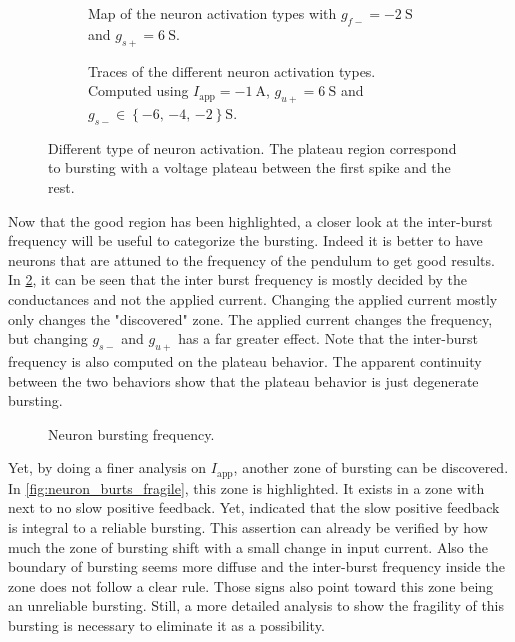 \begin{figure}[!htbp]
    \centering
    \begin{subfigure}[t]{\textwidth}
        \centering
        \caption{Map of the neuron activation types with $g_{f-} =  \qty{-2}{\siemens}$ and $g_{s+} =  \qty{6}{\siemens}$.}
    \end{subfigure}
    
    \begin{subfigure}[b]{\textwidth}
        \centering
        \caption{Traces of the different neuron activation types. Computed using $I_\text{app} = \qty{-1}{\ampere}$, $g_{u+} = \qty{6}{\siemens}$ and $g_{s-}  \in \left\{\num{-6},\,\num{-4},\,\num{-2}\right\}\unit{\siemens}$.}
    \end{subfigure}
    \caption{Different type of neuron activation. The plateau region correspond to bursting with a voltage plateau between the first spike and the rest.}
    \label{fig:neuron_activation}
\end{figure}

Now that the good region has been highlighted, a closer look at the inter-burst frequency will be useful to categorize the bursting. 
Indeed it is better to have neurons that are attuned to the frequency of the pendulum to get good results. 
In \cref{fig:neuron_burts}, it can be seen that the inter burst frequency is mostly decided by the conductances and not the applied current. 
Changing the applied current mostly only changes the "discovered" zone.
The applied current changes the frequency, but changing $g_{s-}$ and $g_{u+}$ has a far greater effect.
Note that the inter-burst frequency is also computed on the plateau behavior.
The apparent continuity between the two behaviors show that the plateau behavior is just degenerate bursting.

\begin{figure}[!htb]
    \centering
    \caption{Neuron bursting frequency.}
    \label{fig:neuron_burts}
\end{figure}

Yet, by doing a finer analysis on $I_\text{app}$, another zone of bursting can be discovered. 
In \cref{fig:neuron_burts_fragile}, this zone is highlighted. 
It exists in a zone with next to no slow positive feedback. 
Yet,\citet{burstingSlowFeedback} indicated that the slow positive feedback is integral to a reliable bursting.
This assertion can already be verified by how much the zone of bursting shift with a small change in input current. 
Also the boundary of bursting seems more diffuse and the inter-burst frequency inside the zone does not follow a clear rule. 
Those signs also point toward this zone being an unreliable bursting. 
Still, a more detailed analysis to show the fragility of this bursting is necessary to eliminate it as a possibility.

